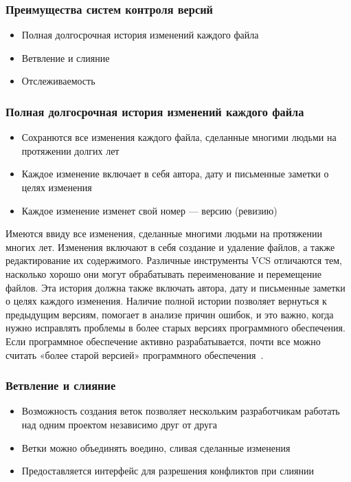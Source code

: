 \documentclass{../industrial-development}
\begin{document}
\begin{frame} \frametitle{Преимущества систем контроля версий}

  \begin{itemize}
  \item Полная долгосрочная история изменений каждого файла
  \item Ветвление и слияние
  \item Отслеживаемость
  \end{itemize}
\end{frame}

\begin{frame} \frametitle{Полная долгосрочная история изменений каждого файла}

  \begin{itemize}
  \item Сохранются все изменения каждого файла, сделанные многими людьми на протяжении долгих лет
  \item Каждое изменение включает в себя автора, дату и письменные заметки о целях изменения
  \item Каждое изменение изменет свой номер --- версию (ревизию)
  \end{itemize}
\end{frame}

\lecturenotes

Имеются ввиду все изменения, сделанные многими людьми на протяжении многих лет. Изменения включают в себя создание и удаление файлов, а также редактирование их содержимого. Различные инструменты VCS отличаются тем, насколько хорошо они могут обрабатывать переименование и перемещение файлов. Эта история должна также включать автора, дату и письменные заметки о целях каждого изменения. Наличие полной истории позволяет вернуться к предыдущим версиям, помогает в анализе причин ошибок, и это важно, когда нужно исправлять проблемы в более старых версиях программного обеспечения. Если программное обеспечение активно разрабатывается, почти все можно считать «более старой версией» программного обеспечения~\cite{Atlassian}.

\begin{frame} \frametitle{Ветвление и слияние}
  
  \begin{itemize}
  \item Возможность создания веток позволяет нескольким разработчикам работать над одним проектом независимо друг от друга
  \item Ветки можно объединять воедино, сливая сделанные изменения
  \item Предоставляется интерфейс для разрешения конфликтов при слиянии
  \end{itemize}
\end{frame}
\end{document}
